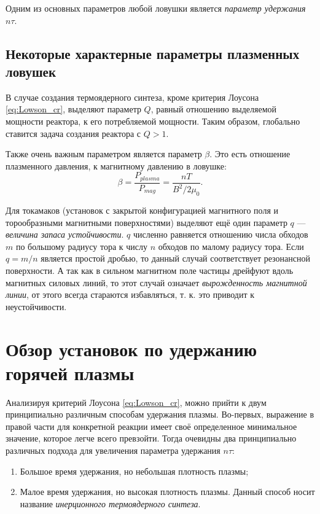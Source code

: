 Одним из основных параметров любой ловушки является \textit{параметр удержания} $n \tau$.


\subsection{Некоторые характерные параметры плазменных ловушек}

В случае создания термоядерного синтеза, кроме критерия Лоусона \eqref{eq:Lowson_cr}, выделяют параметр $Q$, равный отношению выделяемой мощности реактора, к его потребляемой мощности. Таким образом, глобально ставится задача создания реактора с $Q>1$.

Также очень важным параметром является параметр $\beta$. Это есть отношение плазменного давления, к магнитному давлению в ловушке:
\begin{equation}
\beta = \frac{P_{plasma}}{P_{mag}} = \frac{nT}{B^2/2 \mu_0}.
\end{equation}

Для токамаков (установок с закрытой конфигурацией магнитного поля и торообразными магнитными поверхностями) выделяют ещё один параметр $q$ --- \textit{величина запаса устойчивости}. $q$ численно равняется отношению числа обходов $m$ по большому радиусу тора к числу $n$ обходов по малому радиусу тора. Если $q = m/n$ является простой дробью, то данный случай соответствует резонансной поверхности. А так как в сильном магнитном поле частицы дрейфуют вдоль магнитных силовых линий, то этот случай означает \textit{вырожденность магнитной линии}, от этого всегда стараются избавляться, т. к. это приводит к неустойчивости. 


\section{Обзор установок по удержанию горячей плазмы}

Анализируя критерий Лоусона \eqref{eq:Lowson_cr}, можно прийти к двум принципиально различным способам удержания плазмы. Во-первых, выражение в правой части для конкретной реакции имеет своё определенное минимальное значение, которое легче всего превзойти. Тогда очевидны два принципиально различных подхода для увеличения параметра удержания $n \tau$:
\begin{enumerate}
\item Большое время удержания, но небольшая плотность плазмы;
\item Малое время удержания, но высокая плотность плазмы. Данный способ носит название \textit{инерционного термоядерного синтеза}.
\end{enumerate}

